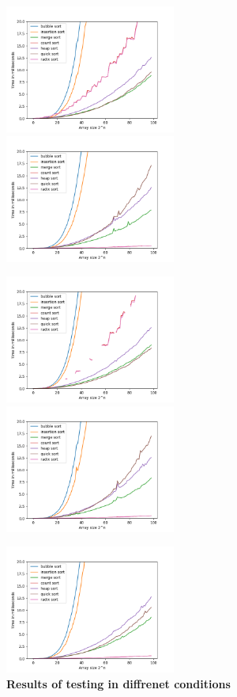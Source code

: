 \documentclass[
10pt, %
a4paper, %
oneside, %
headinclude,footinclude, %
BCOR5mm, %
]{scrartcl}
\begin{document}
\begin{figure}[h]
\centerline{%
\includegraphics[width=0.5\textwidth]{SMALLNUMMS.png}%
\includegraphics[width=0.5\textwidth]{SORTEDNUMS.png}%
}%
\centerline{%
\includegraphics[width=0.5\textwidth] {NEGATIVE NUMS.png}%
\includegraphics[width=0.5\textwidth] {REVESREDNUMS.png}%
}%
\centerline{%
\includegraphics[width=0.5\textwidth] {DUPLICATENUMS.png}%
}%
\caption{\textbf{Results of testing in diffrenet conditions}}
\label{fig}
\end{figure}
\end{document}
